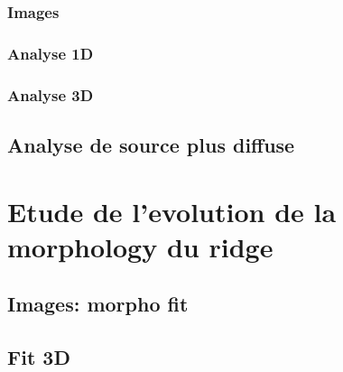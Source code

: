 \documentclass[12pt]{report}
\begin{document}
\subsection{Images}
\subsection{Analyse 1D}
\subsection{Analyse 3D}

\section{Analyse de source plus diffuse}


\chapter{Etude de l'evolution de la morphology du ridge}
\section{Images: morpho fit}
\section{Fit 3D}
\end{document}
